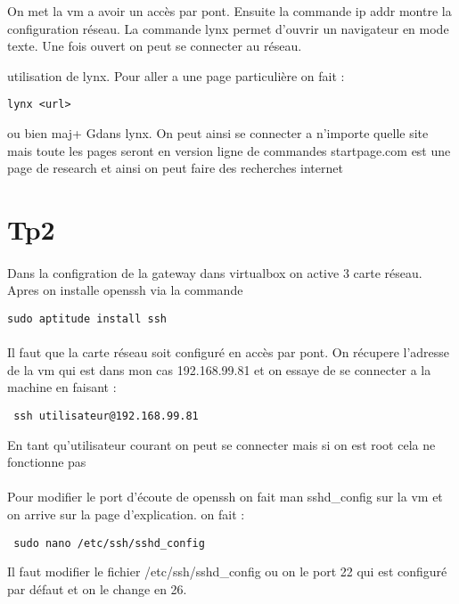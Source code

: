 \documentclass[a4paper,12pt]{article}
\begin{document}
On met la vm a avoir un accès par pont. Ensuite la commande ip addr montre la configuration réseau.
La commande lynx permet d'ouvrir un navigateur en mode texte.
Une fois ouvert on peut se connecter au réseau.
 
utilisation de lynx. Pour aller a une page particulière on fait :
\begin{verbatim}
lynx <url>
\end{verbatim}
 ou bien maj+ Gdans lynx.
On peut ainsi se connecter a n'importe quelle site mais toute les pages seront en version ligne de commandes
startpage.com est une page de research et ainsi on peut faire des recherches internet



\section{Tp2}

\paragraph{}
Dans la configration de la gateway dans virtualbox on active 3 carte réseau.
Apres on installe openssh via la commande 
\begin{verbatim}
sudo aptitude install ssh 
\end{verbatim}

\paragraph{}
Il faut que la carte réseau soit configuré en accès par pont.
On récupere l'adresse de la vm qui est dans mon cas 192.168.99.81 et on essaye de se connecter a la machine en faisant :
\begin{verbatim}
 ssh utilisateur@192.168.99.81
\end{verbatim}
En tant qu'utilisateur courant on peut se connecter mais si on est root cela ne fonctionne pas
\paragraph{}
Pour modifier le port d'écoute de openssh on fait man sshd\_config sur la vm et on arrive sur la page d'explication.
on fait :
\begin{verbatim}
 sudo nano /etc/ssh/sshd_config
\end{verbatim}
Il faut modifier le fichier /etc/ssh/sshd\_config ou on le port 22 qui est configuré par défaut et on le change en 26.
\end{document}

